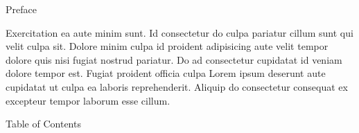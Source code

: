 


\vspace{\myLineheight}\begin{multicols}{2}\raggedcolumns{}

\end{multicols}


{\mktsHTwo{}Preface\mktsHTwoBeg}%


\vspace{\myLineheight}\begin{multicols}{2}\raggedcolumns{}Exercitation ea aute minim sunt. Id consectetur do culpa pariatur cillum sunt qui velit culpa sit. Dolore minim culpa id proident adipisicing aute velit tempor dolore quis nisi fugiat nostrud pariatur. Do ad consectetur cupidatat id veniam dolore tempor est. Fugiat proident officia culpa Lorem ipsum deserunt aute cupidatat ut culpa ea laboris reprehenderit. Aliquip do consectetur consequat ex excepteur tempor laborum esse cillum.




\end{multicols}

\mktsRuleSwell{}

\vspace{\myLineheight}\begin{multicols}{2}\raggedcolumns{}

\end{multicols}


{\mktsHTwo{}Table of Contents\mktsHTwoBeg}%


\vspace{\myLineheight}\begin{multicols}{2}%

\end{multicols}

